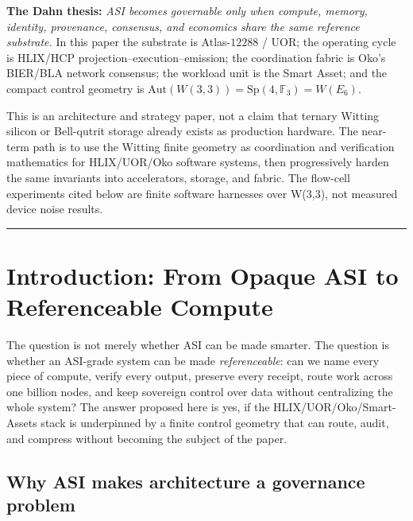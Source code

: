 \documentclass[11pt,letterpaper]{article}
\theoremstyle{remark}
\newcommand{\W}{W(3,3)}
\newcommand{\Sp}{\mathrm{Sp}}
\newcommand{\Aut}{\mathrm{Aut}}
\newcommand{\FF}{\mathbb{F}}
\begin{document}
\begin{bluf}
\noindent\textbf{The Dahn thesis:}
\emph{ASI becomes governable only when compute, memory, identity, provenance, consensus,
and economics share the same reference substrate.} In this paper the substrate is
Atlas-$12288$ / UOR; the operating cycle is HLIX/HCP projection--execution--emission; the
coordination fabric is Oko's BIER/BLA network consensus; the workload unit is the Smart
Asset; and the compact control geometry is $\Aut(\W)=\Sp(4,\FF_3)=W(E_6)$.
\end{bluf}

\begin{guardrail}[Scope]
This is an architecture and strategy paper, not a claim that ternary Witting silicon or
Bell-qutrit storage already exists as production hardware. The near-term path is to use
the Witting finite geometry as coordination and verification mathematics for
HLIX/UOR/Oko software systems, then progressively harden the same invariants into
accelerators, storage, and fabric. The flow-cell experiments cited below are finite
software harnesses over W(3,3), not measured device noise results.
\end{guardrail}

\tableofcontents
\vspace{6pt}\hrule\vspace{8pt}

\section{Introduction: From Opaque ASI to Referenceable Compute}

\begin{plainenglish}
The question is not merely whether ASI can be made smarter. The question is whether an
ASI-grade system can be made \emph{referenceable}: can we name every piece of compute,
verify every output, preserve every receipt, route work across one billion nodes, and keep
sovereign control over data without centralizing the whole system? The answer proposed
here is yes, if the HLIX/UOR/Oko/Smart-Assets stack is underpinned by a finite control
geometry that can route, audit, and compress without becoming the subject of the paper.
\end{plainenglish}

\subsection{Why ASI makes architecture a governance problem}
\end{document}

